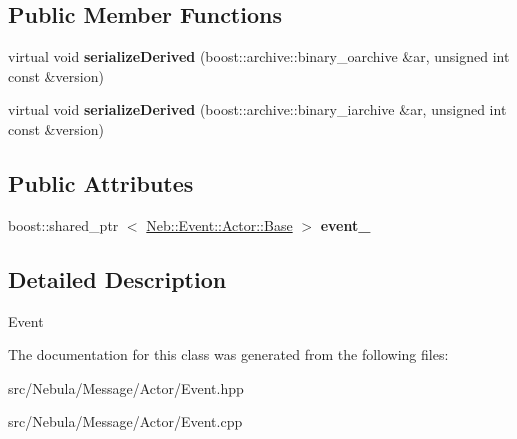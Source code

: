 \subsection*{\-Public \-Member \-Functions}
\begin{DoxyCompactItemize}
\item 
\hypertarget{classNeb_1_1Message_1_1Actor_1_1Event_ab2f1e7d17327e3c8210fe6fe6f2e06a4}{virtual void {\bfseries serialize\-Derived} (boost\-::archive\-::binary\-\_\-oarchive \&ar, unsigned int const \&version)}\label{classNeb_1_1Message_1_1Actor_1_1Event_ab2f1e7d17327e3c8210fe6fe6f2e06a4}

\item 
\hypertarget{classNeb_1_1Message_1_1Actor_1_1Event_aec237654134680923acd2db99e061098}{virtual void {\bfseries serialize\-Derived} (boost\-::archive\-::binary\-\_\-iarchive \&ar, unsigned int const \&version)}\label{classNeb_1_1Message_1_1Actor_1_1Event_aec237654134680923acd2db99e061098}

\end{DoxyCompactItemize}
\subsection*{\-Public \-Attributes}
\begin{DoxyCompactItemize}
\item 
\hypertarget{classNeb_1_1Message_1_1Actor_1_1Event_a6b631077ba9edd5eda8a7a7257542f45}{boost\-::shared\-\_\-ptr\*
$<$ \hyperlink{classNeb_1_1Event_1_1Actor_1_1Base}{\-Neb\-::\-Event\-::\-Actor\-::\-Base} $>$ {\bfseries event\-\_\-}}\label{classNeb_1_1Message_1_1Actor_1_1Event_a6b631077ba9edd5eda8a7a7257542f45}

\end{DoxyCompactItemize}


\subsection{\-Detailed \-Description}
\-Event 

\-The documentation for this class was generated from the following files\-:\begin{DoxyCompactItemize}
\item 
src/\-Nebula/\-Message/\-Actor/\-Event.\-hpp\item 
src/\-Nebula/\-Message/\-Actor/\-Event.\-cpp\end{DoxyCompactItemize}
